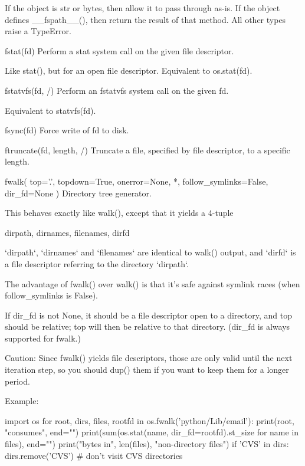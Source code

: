 \documentclass{article}
\begin{document}
        If the object is str or bytes, then allow it to pass through as-is. If the
        object defines __fspath__(), then return the result of that method. All other
        types raise a TypeError.

    fstat(fd)
        Perform a stat system call on the given file descriptor.

        Like stat(), but for an open file descriptor.
        Equivalent to os.stat(fd).

    fstatvfs(fd, /)
        Perform an fstatvfs system call on the given fd.

        Equivalent to statvfs(fd).

    fsync(fd)
        Force write of fd to disk.

    ftruncate(fd, length, /)
        Truncate a file, specified by file descriptor, to a specific length.

    fwalk(
        top='.',
        topdown=True,
        onerror=None,
        *,
        follow_symlinks=False,
        dir_fd=None
    )
        Directory tree generator.

        This behaves exactly like walk(), except that it yields a 4-tuple

            dirpath, dirnames, filenames, dirfd

        `dirpath`, `dirnames` and `filenames` are identical to walk() output,
        and `dirfd` is a file descriptor referring to the directory `dirpath`.

        The advantage of fwalk() over walk() is that it's safe against symlink
        races (when follow_symlinks is False).

        If dir_fd is not None, it should be a file descriptor open to a directory,
          and top should be relative; top will then be relative to that directory.
          (dir_fd is always supported for fwalk.)

        Caution:
        Since fwalk() yields file descriptors, those are only valid until the
        next iteration step, so you should dup() them if you want to keep them
        for a longer period.

        Example:

        import os
        for root, dirs, files, rootfd in os.fwalk('python/Lib/email'):
            print(root, "consumes", end="")
            print(sum(os.stat(name, dir_fd=rootfd).st_size for name in files),
                  end="")
            print("bytes in", len(files), "non-directory files")
            if 'CVS' in dirs:
                dirs.remove('CVS')  # don't visit CVS directories
\end{document}
